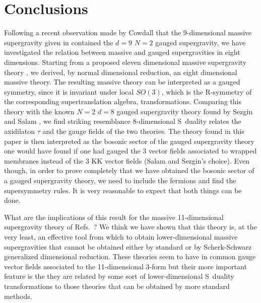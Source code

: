 \documentclass[12pt,a4paper]{article}
\begin{document}
\section{Conclusions}
\label{sec-conclusions}

Following a recent observation made by Cowdall \cite{kn:cow} that the
9-dimensional massive supergravity given in \cite{kn:MO} contained the
$d=9$ $N=2$ gauged supergravity, we have investigated the relation
between massive and gauged supergravities in eight dimensions.
Starting from a proposed eleven dimensional massive supergravity
theory \cite{kn:BLO,kn:MO}, we derived, by normal dimensional
reduction, an eight dimensional massive theory. The resulting massive
theory can be interpreted as a gauged symmetry, since it is invariant
under local $SO(3)$, which is the R-symmetry of the corresponding
supertranslation algebra, transformations. Comparing this theory with
the known $N=2$ $d=8$ gauged supergravity theory found by Sezgin and
Salam \cite{kn:SaSe}, we find striking resemblance 8-dimensional
S~duality relates the axidilaton $\tau$ and the gauge fields of the
two theories. The theory found in this paper is then interpreted as
the bosonic sector of the gauged supergravity theory one would have
found if one had gauged the 3 vector fields associated to wrapped
membranes instead of the 3 KK vector fields (Salam and Sezgin's
choice).  Even though, in order to prove completely that we have
obtained the bosonic sector of a gauged supergravity theory, we need
to include the fermions and find the supersymmetry rules. It is very
reasonable to expect that both things can be done.


What are the implications of this result for the massive
11-dimensional supergravity theory of Refs.~\cite{kn:BLO,kn:MO}?  We
think we have shown that this theory is, at the very least, an
effective tool from which to obtain lower-dimensional massive
supergravities that cannot be obtained either by standard or by
Scherk-Schwarz generalized dimensional reduction. These theories seem
to have in common gauge vector fields associated to the 11-dimensional
3-form but their more important feature is the they are related by
some sort of lower-dimensional S~duality transformations to those
theories that can be obtained by more standard methods.
\end{document}
